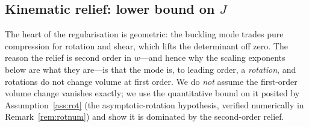 \subsection{Kinematic relief: lower bound on \texorpdfstring{$J$}{J}}

The heart of the regularisation is geometric: the buckling mode trades pure compression for rotation and shear, which
lifts the determinant off zero. The reason the relief is second order in $w$---and hence why the scaling exponents
below are what they are---is that the mode is, to leading order, a \emph{rotation}, and rotations do not change volume
at first order. We do \emph{not} assume the first-order volume change vanishes exactly; we use the quantitative bound on
it posited by Assumption~\ref{ass:rot} (the asymptotic-rotation hypothesis, verified numerically in
Remark~\ref{rem:rotnum}) and show it is dominated by the second-order relief.

